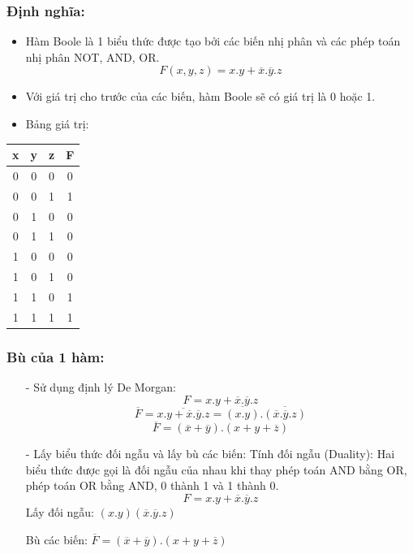 \subsubsection{Định nghĩa:}
\begin{itemize}
    \item Hàm Boole là 1 biểu thức được tạo bởi các biến nhị phân và các phép toán nhị phân NOT, AND, OR.
        \[
            F(x,y,z)=x.y+\overline{x}.\overline{y}.z
        \]
    \item Với giá trị cho trước của các biến, hàm Boole sẽ có giá trị là 0 hoặc 1.
    \item Bảng giá trị:
\end{itemize}
\begin{table}[h!]
    \centering
    \begin{tabular}{|ccc|c|}
    \hline
    \textbf{x} & \textbf{y} & \textbf{z} & \textbf{F} \\ \hline
    0          & 0          & 0          & 0          \\
    0          & 0          & 1          & 1          \\
    0          & 1          & 0          & 0          \\
    0          & 1          & 1          & 0          \\
    1          & 0          & 0          & 0          \\
    1          & 0          & 1          & 0          \\
    1          & 1          & 0          & 1          \\
    1          & 1          & 1          & 1          \\ \hline
    \end{tabular}
    \end{table}
\subsubsection{Bù của 1 hàm:}
\begin{itemize}
    \item[-] Sử dụng định lý De Morgan:
        \[
            F = x.y+\overline{x}.\overline{y}.z
        \]
        \[
            \overline{F} = \overline{x.y+\overline{x}.\overline{y}.z} = \overline{(x.y)}.\overline{(\overline{x}.\overline{y}.z)}
        \]
        \[
            \overline{F} = (\overline{x} + \overline{y}).(x+y+\overline{z})
        \]
    \item[-] Lấy biểu thức đối ngẫu và lấy bù các biến: Tính đối ngẫu (Duality): Hai biểu thức được gọi là đối ngẫu của nhau khi thay phép toán AND bằng OR, phép toán OR bằng AND, 0 thành 1 và 1 thành 0.
        \[
            F = x.y+\overline{x}.\overline{y}.z
        \]
    Lấy đối ngẫu: $(x.y)(\overline{x}.\overline{y}.z)$

    Bù các biến: $\overline{F} = (\overline{x} + \overline{y}).(x+y+\overline{z})$
\end{itemize}

